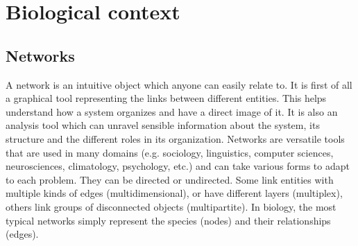 %
%

  \section*{Biological context}
 \subsection*{Networks}
 A network is an intuitive object which anyone can easily relate to. It is first of all a graphical tool representing the links between different entities. This helps understand how a system organizes and have a direct image of it. It is also an analysis tool which can unravel sensible information about the system, its structure and the different roles in its organization. Networks are versatile tools that are  used in many domains (e.g. sociology, linguistics, computer sciences, neurosciences, climatology, psychology, etc.) and can take various forms to adapt to each problem.  They can be directed or undirected. Some link entities with multiple kinds of edges (multidimensional), or have different layers (multiplex), others link groups of disconnected objects (multipartite). In biology, the most typical networks simply represent the species (nodes) and their relationships (edges).

